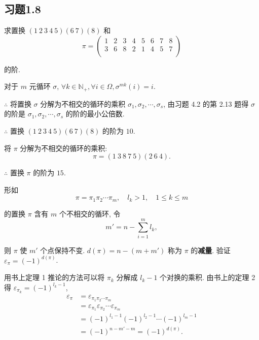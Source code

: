 \documentclass[color=black,device=normal,lang=cn,mode=geye]{elegantnote}
\begin{document}
\subsection{习题1.8}
\addtocounter{exsection}{1}
\begin{exercise}%
    求置换 $(1\ 2\ 3\ 4\ 5)(6\ 7)(8)$ 和
    \[\pi=\begin{pmatrix}
        1 & 2 & 3 & 4 & 5 & 6 & 7 & 8 \\
        3 & 6 & 8 & 2 & 1 & 4 & 5 & 7 \\
    \end{pmatrix}\]

    的阶.
\end{exercise}
\begin{solution}
    对于 $m$ 元循环 $\sigma$, $\forall k\in\mathbb{N_+},\forall i\in\Omega,\sigma^{mk}(i)=i$.

    $\therefore$ 将置换 $\sigma$ 分解为不相交的循环的乘积 $\sigma_1,\sigma_2,\cdots,\sigma_s$, 由习题 4.2 的第 2.13 题得 $\sigma$ 的阶是 $\sigma_1,\sigma_2,\cdots,\sigma_s$ 的阶的最小公倍数.

    $\therefore$ 置换 $(1\ 2\ 3\ 4\ 5)(6\ 7)(8)$ 的阶为 $10$.

    将 $\pi$ 分解为不相交的循环的乘积:
    \[\pi=(1\ 3\ 8\ 7\ 5)(2\ 6\ 4).\]

    $\therefore$ 置换 $\pi$ 的阶为 $15$.
\end{solution}
\begin{exercise}%
    形如
    \[\pi=\pi_1\pi_2\cdots\pi_m,\quad l_k>1,\quad 1\leq k\leq m\]
    
    的置换 $\pi$ 含有 $m$ 个不相交的循环, 令
    \[m'=n-\sum\limits_{i=1}^{m}l_k,\]

    则 $\pi$ 使 $m'$ 个点保持不变. $d(\pi)=n-(m+m')$ 称为 $\pi$ 的\textbf{减量}. 验证 $\varepsilon_\pi=(-1)^{d(\pi)}$.
\end{exercise}
\begin{solution}
    用书上定理 1 推论的方法可以将 $\pi_k$ 分解成 $l_k-1$ 个对换的乘积. 由书上的定理 2 得 $\varepsilon_{\pi_k}=(-1)^{l_k-1}$,
    \begin{align*}
        \varepsilon_{\pi} & =\varepsilon_{\pi_1\pi_2\cdots\pi_m} \\
        & =\varepsilon_{\pi_1}\varepsilon_{\pi_2}\cdots\varepsilon_{\pi_m} \\
        & =(-1)^{l_1-1}(-1)^{l_2-1}\cdots(-1)^{l_m-1} \\
        & =(-1)^{n-m'-m}=(-1)^{d(\pi)}.
    \end{align*}
\end{solution}
\end{document}

